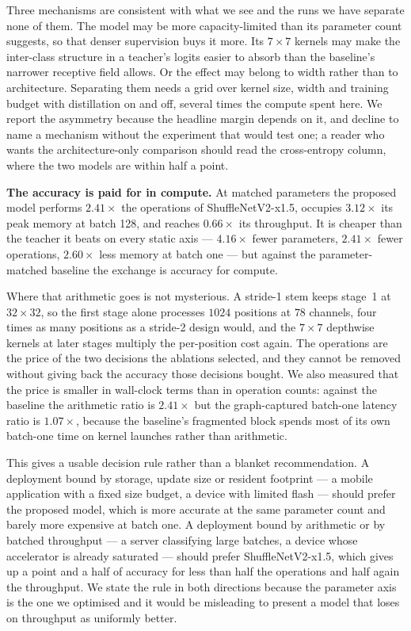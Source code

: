 Three mechanisms are consistent with what we see and the runs we have separate
none of them. The model may be more capacity-limited than its parameter count
suggests, so that denser supervision buys it more. Its $7\times7$ kernels may
make the inter-class structure in a teacher's logits easier to absorb than the
baseline's narrower receptive field allows. Or the effect may belong to width
rather than to architecture. Separating them needs a grid over kernel size,
width and training budget with distillation on and off, several times the
compute spent here. We report the asymmetry because the headline margin
depends on it, and decline to name a mechanism without the experiment that
would test one; a reader who wants the architecture-only comparison should read
the cross-entropy column, where the two models are within half a point.

\textbf{The accuracy is paid for in compute.} At matched parameters the
proposed model performs $2.41\times$ the operations of ShuffleNetV2-x1.5,
occupies $3.12\times$ its peak memory at batch 128, and reaches $0.66\times$
its throughput. It is cheaper than the teacher it beats on every static axis
--- $4.16\times$ fewer parameters, $2.41\times$ fewer operations, $2.60\times$
less memory at batch one --- but against the parameter-matched baseline the
exchange is accuracy for compute.

Where that arithmetic goes is not mysterious. A stride-1 stem keeps stage~1 at
$32\times32$, so the first stage alone processes $1024$ positions at $78$
channels, four times as many positions as a stride-2 design would, and the
$7\times7$ depthwise kernels at later stages multiply the per-position cost
again. The operations are the price of the two decisions the ablations
selected, and they cannot be removed without giving back the accuracy those
decisions bought. We also measured that the price is smaller in wall-clock
terms than in operation counts: against the baseline the arithmetic ratio is
$2.41\times$ but the graph-captured batch-one latency ratio is $1.07\times$,
because the baseline's fragmented block spends most of its own batch-one time
on kernel launches rather than arithmetic.

This gives a usable decision rule rather than a blanket recommendation. A
deployment bound by storage, update size or resident footprint --- a mobile
application with a fixed size budget, a device with limited flash --- should
prefer the proposed model, which is more accurate at the same parameter count
and barely more expensive at batch one. A deployment bound by arithmetic or by
batched throughput --- a server classifying large batches, a device whose
accelerator is already saturated --- should prefer ShuffleNetV2-x1.5, which
gives up a point and a half of accuracy for less than half the operations and
half again the throughput. We state the rule in both directions because the
parameter axis is the one we optimised and it would be misleading to present a
model that loses on throughput as uniformly better.

